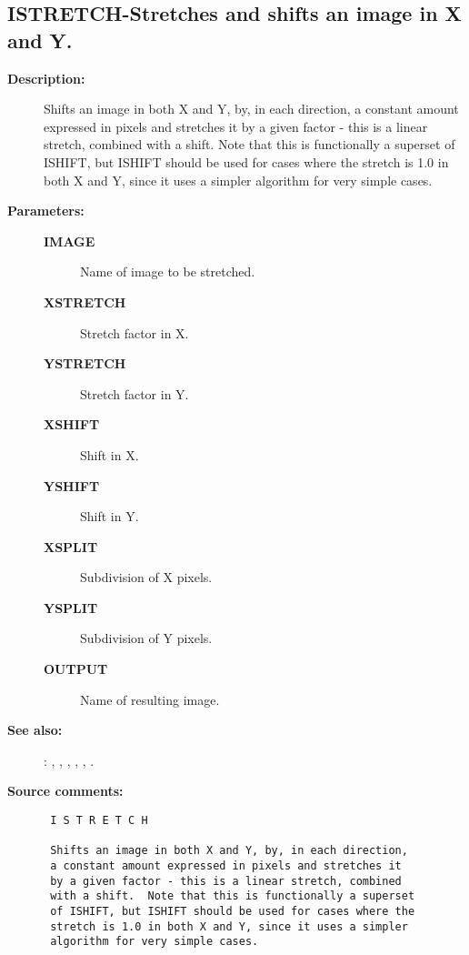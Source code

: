 \subsection{ISTRETCH-\label{ISTRETCH}Stretches and shifts an image in X and Y.}
\begin{description}

\item [{\bf Description:}]
 Shifts an image in both X and Y, by, in each direction,
 a constant amount expressed in pixels and stretches it
 by a given factor - this is a linear stretch, combined
 with a shift.  Note that this is functionally a superset
 of ISHIFT, but ISHIFT should be used for cases where the
 stretch is 1.0 in both X and Y, since it uses a simpler
 algorithm for very simple cases.

\item [{\bf Parameters:}]
\begin{description}
\item [{\bf IMAGE}]
 Name of image to be stretched.
\item [{\bf XSTRETCH}]
 Stretch factor in X.
\item [{\bf YSTRETCH}]
 Stretch factor in Y.
\item [{\bf XSHIFT}]
 Shift in X.
\item [{\bf YSHIFT}]
 Shift in Y.
\item [{\bf XSPLIT}]
 Subdivision of X pixels.
\item [{\bf YSPLIT}]
 Subdivision of Y pixels.
\item [{\bf OUTPUT}]
 Name of resulting image.
\end{description}

\item [{\bf See also:}]
: , , , , , .\\

\item [{\bf Source comments:}]
\begin{verbatim}
 I S T R E T C H

 Shifts an image in both X and Y, by, in each direction,
 a constant amount expressed in pixels and stretches it
 by a given factor - this is a linear stretch, combined
 with a shift.  Note that this is functionally a superset
 of ISHIFT, but ISHIFT should be used for cases where the
 stretch is 1.0 in both X and Y, since it uses a simpler
 algorithm for very simple cases.


\end{verbatim}
\end{description}
